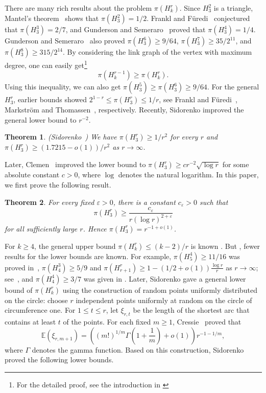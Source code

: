 \documentclass[12pt,a4paper]{article}
\numberwithin{equation}{section}
\newtheorem{theorem}{Theorem}[section]
\theoremstyle{definition}
\theoremstyle{remark}
\begin{document}
There are many rich results about the problem $\pi(H_k^r)$. Since $H_3^2$ is a triangle, Mantel's theorem~\cite{Mantel1907} shows that $\pi(H_3^2)=1/2$. Frankl and F\"uredi~\cite{FranklFuredi1984} conjectured that $\pi(H_3^3)=2/7$, and Gunderson and Semeraro~\cite{GundersonSemeraro2017} proved that $\pi(H_3^4)=1/4$.
Gunderson and Semeraro~\cite{GundersonSemeraro2025} also proved $\pi(H_3^6)\ge 9/64$, $\pi(H_3^7)\ge 35/2^{11}$, and $\pi(H_3^8)\ge 315/2^{14}$.
By considering the link graph of the vertex with maximum degree, one can easily get\footnote{For the detailed proof, see the introduction in \cite{Sidorenko2024} } 
\begin{equation}\label{eq:monotonicity}
\pi(H_k^{r-1})\ge \pi(H_k^r).
\end{equation}
Using this inequality, we can also get $\pi(H_3^5)\ge\pi(H_3^6)\ge 9/64$. For the general $H_3^r$, earlier bounds showed $2^{1-r}\le \pi(H_3^r)\le 1/r$,
see Frankl and F\"uredi~\cite{FranklFuredi1984},  Markstr\"om and Thomassen~\cite{MarkstromThomassen2021}, respectively. Recently,
Sidorenko improved the general lower bound to $r^{-2}$.
\begin{theorem}\label{end:lem:positive}(Sidorenko~\cite{Sidorenko2024})
We have $\pi(H_3^r)\ge 1/r^{2}$ for every $r$ and
$\pi(H_3^r)\ge (1.7215-o(1))/r^{2}$ as $r\to\infty$.   
\end{theorem}
Later, 
Clemen~\cite{Clemen2026} improved the  lower bound to $\pi(H_3^r)\ge c r^{-2}\sqrt{\log r}$ for some absolute constant $c>0$, where $\log$ denotes the natural logarithm.
In this paper, we first prove the following result.

\begin{theorem}\label{end:thm:main}
For every fixed $\varepsilon>0$, there is a constant $c_\varepsilon>0$ such that
$$\pi(H_3^r)\ge \frac{c_\varepsilon}{r(\log r)^{2+\varepsilon}}$$
for all sufficiently large $r$.  
Hence $\pi(H_3^r)=r^{-1+o(1)}$.
\end{theorem}

For $k\ge4$, the general upper bound $\pi(H_k^r)\le (k-2)/r$ is known \cite{MarkstromThomassen2021}.
But , fewer results  for the lower bounds are known. For example, $\pi(H_5^4)\ge 11/16$ was proved in~\cite{deCaenKreherWiseman1988,Giraud1990}, $\pi(H_4^3)\ge 5/9$ and $\pi(H_{r+1}^r)\ge 1-\left(1/2+o(1)\right)\frac{\log r}{r}$ as $r\to\infty$; see~\cite{Sidorenko1995,Sidorenko1997}, and  $\pi(H_4^4)\ge 3/7$  was given in \cite{Sidorenko2024}. Later, Sidorenko  gave a general lower bound of $\pi(H_k^r)$ using the construction  of random points uniformly distributed on the circle: choose $r$ independent points uniformly at random on the circle of circumference one.
For $1\le t\le r$, let $\xi_{r,t}$ be the length of the shortest arc that contains at least $t$ of the points.
For each fixed $m\ge1$, Cressie~\cite{Cressie1977Gap} proved that
$$ \mathbb{E}(\xi_{r,m+1})=\left((m!)^{1/m}\Gamma\left(1+\frac1m\right)+o(1)\right)r^{-1-1/m},$$
where $\Gamma$ denotes the gamma function. Based on this construction, Sidorenko proved the following lower bounds.
\end{document}
